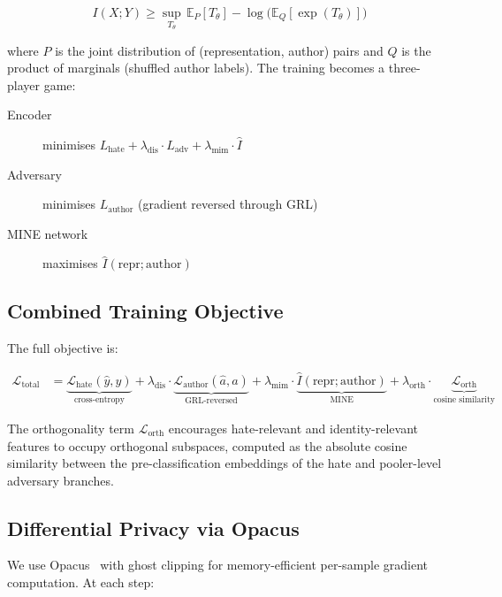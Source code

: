 \documentclass{article}
\begin{document}
\begin{equation}
\label{eq:mine}
I(X;Y) \geq \sup_{T_\theta} \,
\mathbb{E}_{P}[T_\theta] - \log\big(\mathbb{E}_{Q}[\exp(T_\theta)]\big)
\end{equation}

\noindent
where $P$ is the joint distribution of (representation, author) pairs
and $Q$ is the product of marginals (shuffled author labels).
The training becomes a three-player game:
\begin{description}
  \item[Encoder] minimises $L_{\text{hate}} + \lambda_{\text{dis}} \cdot L_{\text{adv}}
        + \lambda_{\text{mim}} \cdot \hat{I}$
  \item[Adversary] minimises $L_{\text{author}}$ (gradient reversed through GRL)
  \item[MINE network] maximises $\hat{I}(\text{repr}; \text{author})$
\end{description}

\subsection{Combined Training Objective}

The full objective is:

\begin{align}
\label{eq:objective}
\mathcal{L}_{\text{total}} &=
\underbrace{\mathcal{L}_{\text{hate}}(\hat{y}, y)}_{\text{cross-entropy}}
+ \lambda_{\text{dis}} \cdot \underbrace{\mathcal{L}_{\text{author}}(\hat{a}, a)}_{\text{GRL-reversed}}
+ \lambda_{\text{mim}} \cdot \underbrace{\hat{I}(\text{repr}; \text{author})}_{\text{MINE}}
+ \lambda_{\text{orth}} \cdot \underbrace{\mathcal{L}_{\text{orth}}}_{\text{cosine similarity}}
\end{align}

The orthogonality term $\mathcal{L}_{\text{orth}}$ encourages
hate-relevant and identity-relevant features to occupy orthogonal
subspaces, computed as the absolute cosine similarity between the
pre-classification embeddings of the hate and pooler-level adversary
branches.

\subsection{Differential Privacy via Opacus}

We use Opacus~\cite{yousefpour2021opacus} with ghost clipping for
memory-efficient per-sample gradient computation. At each step:
\end{document}
